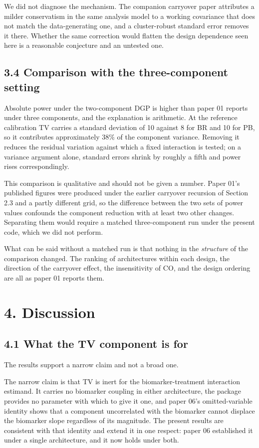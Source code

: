 \documentclass[
  11pt,
]{article}
\begin{document}
We did not diagnose the mechanism. The companion carryover paper
attributes a milder conservatism in the same analysis model to a
working covariance that does not match the data-generating one, and a
cluster-robust standard error removes it there. Whether the same
correction would flatten the design dependence seen here is a
reasonable conjecture and an untested one.

\subsection{3.4 Comparison with the three-component setting}

Absolute power under the two-component DGP is higher than paper 01
reports under three components, and the explanation is arithmetic.
At the reference calibration TV carries a standard deviation of 10
against 8 for BR and 10 for PB, so it contributes approximately 38\%
of the component variance. Removing it reduces the residual variation
against which a fixed interaction is tested; on a variance argument
alone, standard errors shrink by roughly a fifth and power rises
correspondingly.

This comparison is qualitative and should not be given a number.
Paper 01's published figures were produced under the earlier
carryover recursion of Section 2.3 and a partly different grid, so
the difference between the two sets of power values confounds the
component reduction with at least two other changes. Separating them
would require a matched three-component run under the present code,
which we did not perform.

What can be said without a matched run is that nothing in the
\emph{structure} of the comparison changed. The ranking of
architectures within each design, the direction of the carryover
effect, the insensitivity of CO, and the design ordering are all as
paper 01 reports them.

\section{4. Discussion}

\subsection{4.1 What the TV component is for}

The results support a narrow claim and not a broad one.

The narrow claim is that TV is inert for the biomarker-treatment
interaction estimand. It carries no biomarker coupling in either
architecture, the package provides no parameter with which to give it
one, and paper 06's omitted-variable identity shows that a component
uncorrelated with the biomarker cannot displace the biomarker slope
regardless of its magnitude. The present results are consistent with
that identity and extend it in one respect: paper 06 established it
under a single architecture, and it now holds under both.
\end{document}
